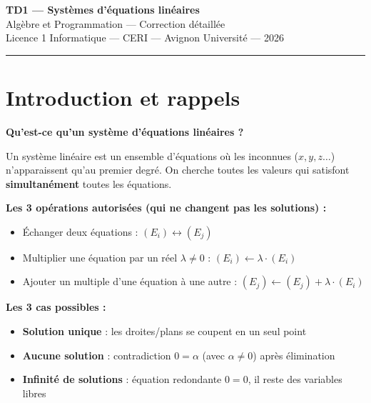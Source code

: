 \documentclass[12pt,a4paper]{article}
\begin{document}
\begin{center}
  {\LARGE \textbf{TD1 --- Systèmes d'équations linéaires}}\\[0.5em]
  {\large Algèbre et Programmation --- Correction détaillée}\\[0.3em]
  {\normalsize Licence 1 Informatique --- CERI --- Avignon Université --- 2026}
\end{center}
\vspace{0.5em}\hrule\vspace{1em}

\section*{Introduction et rappels}

\begin{rappel}
\textbf{Qu'est-ce qu'un système d'équations linéaires ?}

Un système linéaire est un ensemble d'équations où les inconnues ($x, y, z\ldots$) n'apparaissent qu'au premier degré. On cherche toutes les valeurs qui satisfont \textbf{simultanément} toutes les équations.

\medskip
\textbf{Les 3 opérations autorisées (qui ne changent pas les solutions) :}
\begin{itemize}[noitemsep]
  \item Échanger deux équations : $(E_i) \leftrightarrow (E_j)$
  \item Multiplier une équation par un réel $\lambda \neq 0$ : $(E_i) \leftarrow \lambda \cdot (E_i)$
  \item Ajouter un multiple d'une équation à une autre : $(E_j) \leftarrow (E_j) + \lambda \cdot (E_i)$
\end{itemize}

\medskip
\textbf{Les 3 cas possibles :}
\begin{itemize}[noitemsep]
  \item \textbf{Solution unique} : les droites/plans se coupent en un seul point
  \item \textbf{Aucune solution} : contradiction $0 = \alpha$ (avec $\alpha \neq 0$) après élimination
  \item \textbf{Infinité de solutions} : équation redondante $0 = 0$, il reste des variables libres
\end{itemize}
\end{rappel}
\end{document}
